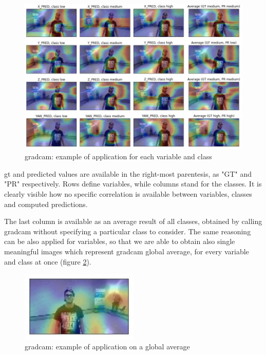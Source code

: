 \begin{figure}[!h]
	\centering
	\includegraphics[width=1\textwidth]{"contents/images/gradcam/04-gradcam-example-1"}
	\caption[\gls{gradcam}: example of application for each variable and class]{\gls{gradcam}: example of application for each variable and class}
	\label{fig:gradcam-example-1}
\end{figure}

\gls{gt} and predicted values are available in the right-most parentesis, as "GT" and "PR" respectively. Rows define variables, while columns stand for the classes. It is clearly visible how no specific correlation is available between variables, classes and computed predictions.

The last column is available as an average result of all classes, obtained by calling \gls{gradcam} without specifying a particular class to consider. The same reasoning can be also applied for variables, so that we are able to obtain also single meaningful images which represent \gls{gradcam} global average, for every variable and class at once (figure \ref{fig:gradcam-example-2}).

\begin{figure}[!h]
	\centering
	\includegraphics[width=0.5\textwidth]{"contents/images/gradcam/04-gradcam-example-2"}
	\caption[\gls{gradcam}: example of application on a global average]{\gls{gradcam}: example of application on a global average}
	\label{fig:gradcam-example-2}
\end{figure}



